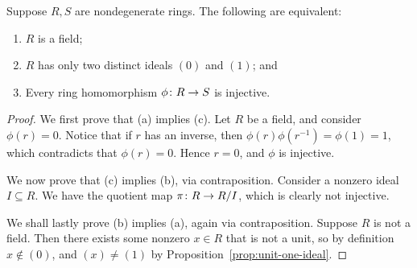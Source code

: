 \begin{theorem}\label{thm:field-props}
    Suppose \(R,S\) are nondegenerate rings.
    The following are equivalent:
    \begin{enumerate}[label={(\alph*)}, itemsep=0mm]
        \item \(R\) is a field;
        \item \(R\) has only two distinct ideals \((0)\) and \((1)\); and
        \item Every ring homomorphism \(\phi\colon R\to S\) is injective.
    \end{enumerate}
\end{theorem}
\begin{proof}
    We first prove that (a) implies (c).
    Let \(R\) be a field, and consider \(\phi(r) = 0\).
    Notice that if \(r\) has an inverse,
    then \(\phi(r)\phi(r^{-1}) = \phi(1) = 1\),
    which contradicts that \(\phi(r) = 0\).
    Hence \(r = 0\), and \(\phi\) is injective.

    We now prove that (c) implies (b), via contraposition.
    Consider a nonzero ideal \(I \subseteq R\).
    We have the quotient map \(\pi\colon R\to R/I\),
    which is clearly not injective.
    
    We shall lastly prove (b) implies (a), again via contraposition.
    Suppose \(R\) is not a field.
    Then there exists some nonzero \(x \in R\) that is not a unit,
    so by definition \(x \notin (0)\),
    and \((x) \neq (1)\) by Proposition~\ref{prop:unit-one-ideal}.
\end{proof}

